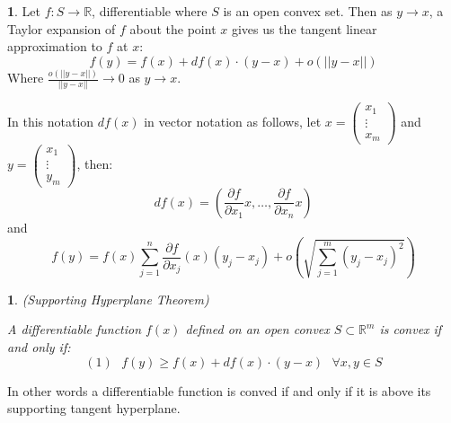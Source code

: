 \documentclass[english,12pt]{article}
\theoremstyle{plain}
\newtheorem*{proposition}{\protect\propositionname}
\theoremstyle{definition}
\theoremstyle{definition} %
\newtheorem*{notationenv}{\protect\notationname}
\newcommand{\prop}[1]{\begin{proposition} #1 \end{proposition} }
\newcommand{\notation}[1]{\begin{notationenv} #1 \end{notationenv} }
\providecommand{\propositionname}{Proposition}
\providecommand{\notationname}{Notation}
\newcommand{\brac}[1]{\left(#1\right)} %
\newcommand{\R}{\mathbb{R}} %
\begin{document}
\notation{
Let $f:S\rightarrow\R$, differentiable where $S$ is an open convex set.  Then as $y\rightarrow x$, a Taylor expansion of $f$ about the point $x$ gives us the tangent linear approximation to $f$ at $x$:
\[f(y)=f(x)+df(x)\cdot(y-x)+o(||y-x||)\]
Where $\frac{o(||y-x||)}{||y-x||}\rightarrow 0$ as $y\rightarrow x$.

In this notation $df(x)$ in vector notation as follows, let 
$x=\begin{pmatrix}x_1\\
\vdots\\
x_m
\end{pmatrix}$ and 
$y=\begin{pmatrix}
x_1\\
\vdots\\
y_m
\end{pmatrix}$, then:
\[df(x)=\brac{\frac{\partial f}{\partial x_1}x,\ldots,\frac{\partial f}{\partial x_n}x}\]
and
\[f(y)=f(x)\sum\limits_{j=1}^n\frac{\partial f}{\partial{x_j}}(x)(y_j-x_j)+o\brac{\sqrt{\sum\limits_{j=1}^m(y_j-x_j)^2}}\]
}

\prop{ (Supporting Hyperplane Theorem)

A differentiable function $f(x)$ defined on an open convex $S\subset\R^m$ is convex if and only if:
\[(1)\text{ }f(y)\ge f(x)+df(x)\cdot(y-x)\text{ }\forall x,y\in S\]
}
In other words a differentiable function is conved if and only if it is above its supporting tangent hyperplane.
\end{document}
